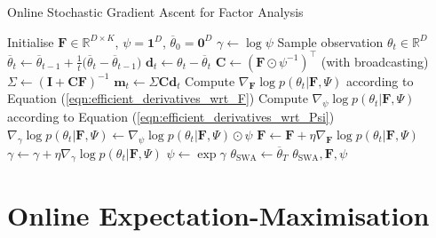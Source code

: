 \documentclass[msc,deptreport.inf]{infthesis} %
\newcommand{\matr}[1]{\mathbf{#1}}
\newcommand{\R}{\mathbb R}
\begin{document}
\begin{algorithm}[!htbp] 
	\caption{Online Stochastic Gradient Ascent for Factor Analysis}
	\label{alg:gradient_fa}
	\begin{algorithmic}[1]
		\State Initialise $\matr{F} \in \R^{D \times K}$, $\psi = \matr{1}^D$, $\overline{\theta}_0 = \matr{0}^D$
		\State $\gamma \leftarrow \log \psi$
			\State Sample observation $\theta_t \in \R^D$
			\State
				$\overline{\theta}_t \leftarrow  \overline{\theta}_{t-1} + \frac{1}{t}\big(\overline{\theta}_t - \overline{\theta}_{t-1}\big)$
			\State $\matr{d}_t \leftarrow \theta_t - \overline{\theta}_t$
			\State $\matr{C} \leftarrow (\matr{F} \odot \psi^{-1})^\intercal$ (with broadcasting)
			\State $\Sigma \leftarrow (\matr{I} + \matr{C} \matr{F})^{-1}$ 
			\State $\matr{m}_t \leftarrow \Sigma \matr{C} \matr{d}_t$ 
			\State Compute $\nabla_{\matr{F}} \log p(\theta_t | \matr{F}, \Psi)$ 
			according to Equation (\ref{eqn:efficient_derivatives_wrt_F})
			\State Compute $\nabla_{\psi} \log p(\theta_t | \matr{F}, \Psi)$ 
			according to Equation (\ref{eqn:efficient_derivatives_wrt_Psi})
			\State $\nabla_{\gamma} \log p(\theta_t | \matr{F}, \Psi) \leftarrow \nabla_{\psi} \log p(\theta_t | \matr{F}, \Psi) \odot \psi$
			\State $\matr{F} \leftarrow \matr{F} + \eta \nabla_{\matr{F}} \log p(\theta_t | \matr{F}, \Psi)$
			\State $\gamma \leftarrow \gamma + \eta \nabla_{\gamma} \log p(\theta_t | \matr{F}, \Psi)$
			\State $\psi \leftarrow \exp \gamma$
		\EndFor
		\State $\theta_{\text{SWA}} \leftarrow \overline{\theta}_T$
		\State \Return $\theta_{\text{SWA}}, \matr{F}, \psi$
	\end{algorithmic}
\end{algorithm}

\section{Online Expectation-Maximisation}\label{sec:online_em}
\end{document}
